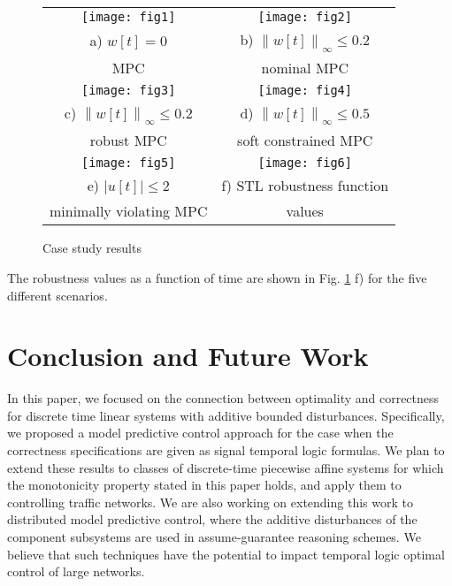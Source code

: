 \documentclass[letterpaper, 10 pt, conference]{ieeeconf}
\begin{document}
\begin{figure}[t]
\begin{center}
\begin{tabular}{@{}c@{}@{}c@{}}

            \texttt{[image: fig1]} &  \texttt{[image: fig2]}
                        \\
                                          a) $w[t]=0$ & b) $\left \|w[t] \right \|_\infty \le 0.2$ \\
                                                                                    MPC & nominal MPC
                        \\
                      \texttt{[image: fig3]} &    \texttt{[image: fig4]} 
                        \\
                        c) $\left \|w[t] \right \|_\infty \le 0.2$  & d) $\left \|w[t] \right \|_\infty \le 0.5$
                        \\
                        robust MPC & soft constrained MPC
                        \\
                                              \texttt{[image: fig5]} &    \texttt{[image: fig6]}
                        \\
                        e) $\left |u[t] \right | \le 2$  & f) STL robustness function
                        \\
                        minimally violating MPC & values
                        
        \end{tabular}
\caption{Case study results}
\label{fig:case}
\end{center}
\end{figure}

The robustness values as a function of time are shown in Fig. \ref{fig:case} f) for the five different scenarios. 


\section{Conclusion and Future Work}


In this paper, we focused on the connection between optimality and correctness for discrete time linear systems with additive bounded disturbances. Specifically, we proposed a model predictive control approach for the case when the correctness specifications are given as signal temporal logic formulas. We plan to extend these results to classes of discrete-time piecewise affine systems for which the monotonicity property stated in this paper holds, and apply them to controlling traffic networks. We are also working on extending this work to distributed model predictive control, where the additive disturbances of the component subsystems are used in assume-guarantee reasoning schemes. We believe that such techniques have the potential to impact temporal logic optimal control of large networks.


\end{document}
